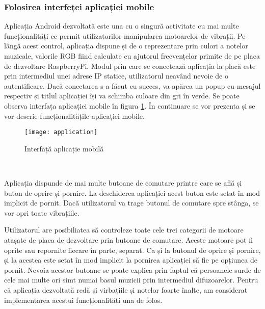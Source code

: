 \documentclass[../IoMusT.tex]{subfiles}
\begin{document}
\subsubsection{Folosirea interfeței aplicației mobile}
Aplicația Android dezvoltată este una cu o singură activitate cu mai multe funcționalități ce permit utilizatorilor manipularea motoarelor de vibrații.
 Pe lângă acest control, aplicația dispune și de o reprezentare prin culori a notelor muzicale, valorile RGB fiind calculate cu ajutorul frecvențelor primite de pe placa de dezvoltare RaspberryPi. Modul prin care se conectează aplicația la placă este prin intermediul unei adrese IP statice, utilizatorul neavând nevoie de o autentificare. Dacă conectarea s-a făcut cu succes, va apărea un popup cu mesajul respectiv și titlul aplicației își va schimba culoare din gri în verde. Se poate observa interfața aplicației mobile în figura \ref{fig:application}. În continuare se vor prezenta și se vor descrie funcționalitățile aplicației mobile.
\begin{figure}[h]
\begin{center}
\texttt{[image: application]}
\caption{Interfață aplicație mobilă}
\label{fig:application}
\end{center}
\end{figure}
\\
\par Aplicația dispunde de mai multe butoane de comutare printre care se află și buton de oprire și pornire. La deschiderea aplicației acest buton este setat în mod implicit de pornit. Dacă utilizatorul va trage butonul de comutare spre stânga, se vor opri toate vibrațiile.
\\ %
\par Utilizatorul are posibiliatea să controleze toate cele trei categorii de motoare atașate de placa de dezvoltare prin butoane de comutare. Aceste motoare pot fi oprite sau repornite fiecare în parte, separat. Ca și la butonul de oprire și pornire, și la acestea este setat în mod implicit la pornirea aplicației să fie pe opțiunea de pornit. Nevoia acestor butoane se poate explica prin faptul că persoanele surde de cele mai multe ori simt numai basul muzicii prin intermediul difuzoarelor. Pentru că aplicația dezvoltată redă și virbațiile și notelor foarte înalte, am considerat implementarea acestui funcționalități una de folos. 
\end{document}
